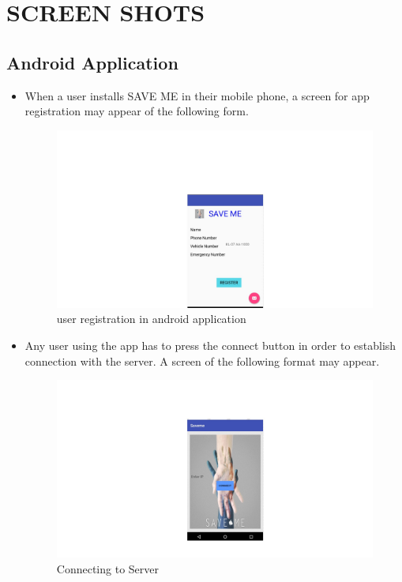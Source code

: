 \documentclass[12pt,a4paper,oneside]{report}
\begin{document}
{\section{SCREEN SHOTS}
\subsection{Android Application}
\begin{itemize}
\item \par When a user installs SAVE ME in their mobile phone, a screen for app registration may appear of the following form. 
\begin{figure}[h]
\begin{center}
\includegraphics[scale=.4]{vehicalReg.jpg}
\caption{user registration in android application}
\label{user registration in android application}
\end{center}
\end{figure}
\newpage
\item \par Any user using the app has to press the connect button in order to establish connection with the server. A screen of the following format may appear.
\begin{figure}[h]
\begin{center}
\includegraphics[scale=.4]{ipSeting.jpg}
\caption{Connecting to Server}
\label{Connecting to Server}
\end{center}
\end{figure}
\end{itemize}
\newpage 
}
\end{document}
